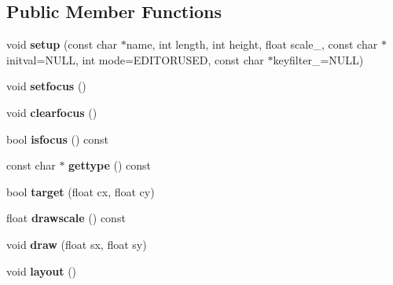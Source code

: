 \subsection*{Public Member Functions}
\begin{DoxyCompactItemize}
\item 
\mbox{\label{struct_u_i_1_1_text_editor_aa9f3b7e8c7e5a7e4874b5be25f340ef4}} 
void {\bfseries setup} (const char $\ast$name, int length, int height, float scale\+\_, const char $\ast$initval=N\+U\+LL, int mode=E\+D\+I\+T\+O\+R\+U\+S\+ED, const char $\ast$keyfilter\+\_\+=N\+U\+LL)
\item 
\mbox{\label{struct_u_i_1_1_text_editor_a5c2d22e741949f9b9deea78a12e1bc03}} 
void {\bfseries setfocus} ()
\item 
\mbox{\label{struct_u_i_1_1_text_editor_ab2a96353f81cfc817856607ac9c438dc}} 
void {\bfseries clearfocus} ()
\item 
\mbox{\label{struct_u_i_1_1_text_editor_ac81f2488ef7950a915b875d19178011e}} 
bool {\bfseries isfocus} () const
\item 
\mbox{\label{struct_u_i_1_1_text_editor_a616f61faa707998fb2c9fa29b7b3ac20}} 
const char $\ast$ {\bfseries gettype} () const
\item 
\mbox{\label{struct_u_i_1_1_text_editor_aaa41d6594001f42dd42bb0934d150ed0}} 
bool {\bfseries target} (float cx, float cy)
\item 
\mbox{\label{struct_u_i_1_1_text_editor_a1cdcbceeb9dda16b8a8d313e694c9057}} 
float {\bfseries drawscale} () const
\item 
\mbox{\label{struct_u_i_1_1_text_editor_ab65379c8a3c60b7ba495a0338ea519a5}} 
void {\bfseries draw} (float sx, float sy)
\item 
\mbox{\label{struct_u_i_1_1_text_editor_a9495133023602c5173a5fdcd7ddecd0c}} 
void {\bfseries layout} ()
\item 
\mbox{\label{struct_u_i_1_1_text_editor_ab83559027543ac4fc915780e56d7cb95}} 

\end{DoxyCompactItemize}
